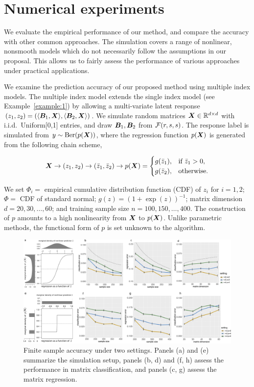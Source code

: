\documentclass[11pt]{article}
\theoremstyle{definition}
\begin{document}
\section{Numerical experiments}\label{sec:data}
We evaluate the empirical performance of our method, and compare the accuracy with other common approaches. The simulation covers a range of nonlinear, nonsmooth models which do not necessarily follow the assumptions in our proposal. This allows us to fairly assess the performance of various approaches under practical applications. 

We examine the prediction accuracy of our proposed method using multiple index models. The multiple index model extends the single index model (see Example~\ref{example:1}) by allowing a multi-variate latent response $(z_1,z_2)=\left(\langle \bm B_1, \bm X \rangle,\langle \bm B_2, \bm X \rangle\right)$. We simulate random matrices $\bm X\in\mathbb{R}^{d\times d}$ with i.i.d.\ Uniform[0,1] entries, and draw $\bm B_1, \bm B_2$ from $\mathcal{F}(r,s,s)$. The response label is simulated from $y\sim \text{Ber}(p(\bm X))$, where the regression function $p(\bm X)$ is generated from the following chain scheme,

\begin{equation}
\bm X \to (z_1,z_2) \to 
(\bar z_1, \bar z_2)
\to p(\bm X)=
\begin{cases}
g(\bar z_1), & \text{if }\bar z_1>0,\\
g(\bar z_2), & \text{otherwise}. 
\end{cases}
\end{equation}

We set $\Phi_i = $ empirical cumulative distribution function (CDF) of $z_i$ for $i=1,2$; $\Phi = $ CDF of standard normal; $g(z)=(1+\exp(z))^{-1}$; matrix dimension $d=20,30,\ldots,60$; and training sample size $n=100, 150, \ldots, 400$. The construction of $p$ amounts to a high nonlinearity from $\bm X$ to $p(\bm X)$. Unlike parametric methods, the functional form of $p$ is set unknown to the algorithm. 

\begin{figure}[ht]
\centering
\includegraphics[width=1\textwidth]{combined.pdf}
\caption{Finite sample accuracy under two settings. Panels (a) and (e) summarize the simulation setup, panels (b, d) and (f, h) assess the performance in matrix classification, and panels (c, g) assess the matrix regression. }\label{fig:logistic}
\end{figure}
\end{document}
